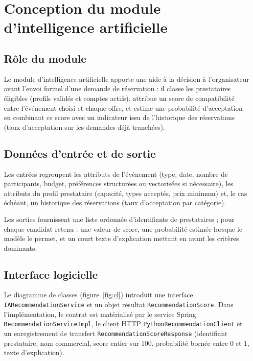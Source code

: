 \documentclass[a4paper,12pt]{report}
\begin{document}
\chapter{Conception du module d'intelligence artificielle}
\label{chap:ia}

\section{Rôle du module}

Le module d'intelligence artificielle apporte une aide à la décision à l'organisateur avant l'envoi formel d'une demande de réservation : il classe les prestataires éligibles (profils validés et comptes actifs), attribue un score de compatibilité entre l'événement choisi et chaque offre, et estime une probabilité d'acceptation en combinant ce score avec un indicateur issu de l'historique des réservations (taux d'acceptation sur les demandes déjà tranchées).

\section{Données d'entrée et de sortie}

Les entrées regroupent les attributs de l'événement (type, date, nombre de participants, budget, préférences structurées ou vectorisées si nécessaire), les attributs du profil prestataire (capacité, types acceptés, prix minimum) et, le cas échéant, un historique des réservations (taux d'acceptation par catégorie).

Les sorties fournissent une liste ordonnée d'identifiants de prestataires ; pour chaque candidat retenu : une valeur de score, une probabilité estimée lorsque le modèle le permet, et un court texte d'explication mettant en avant les critères dominants.

\section{Interface logicielle}

Le diagramme de classes (figure~\ref{fig:cl}) introduit une interface \texttt{IARecommendationService} et un objet résultat \texttt{RecommendationScore}. Dans l'implémentation, le contrat est matérialisé par le service Spring \texttt{RecommendationServiceImpl}, le client HTTP \texttt{PythonRecommendationClient} et un enregistrement de transfert \texttt{RecommendationScoreResponse} (identifiant prestataire, nom commercial, score entier sur 100, probabilité bornée entre 0 et 1, texte d'explication).
\end{document}
